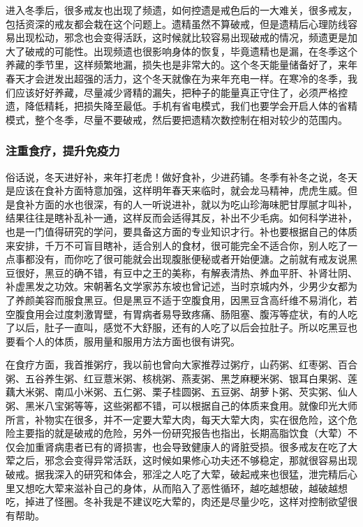 进入冬季后，很多戒友也出现了频遗，如何控遗是戒色后的一大难关，很多戒友，包括资深的戒友都会栽在这个问题上。遗精虽然不算破戒，但是遗精后心理防线容易出现松动，邪念也会变得活跃，这时候就比较容易出现破戒的情况，频遗更是加大了破戒的可能性。出现频遗也很影响身体的恢复，毕竟遗精也是漏，在冬季这个养藏的季节里，这样频繁地漏，损失也是非常大的。这个冬天能量储备好了，来年春天才会迸发出超强的活力，这个冬天就像在为来年充电一样。在寒冷的冬季，我们应该好好养藏，尽量减少肾精的漏失，把种子的能量真正守住了，必须严格控遗，降低精耗，把损失降至最低。手机有省电模式，我们也要学会开启人体的省精模式，整个冬季，尽量不要破戒，然后要把遗精次数控制在相对较少的范围内。

\subsubsection{注重食疗，提升免疫力}

俗话说，冬天进好补，来年打老虎！做好食补，少进药铺。冬季有补冬之说，冬天是应该在食补方面特意加强，这样明年春天来临时，就会龙马精神，虎虎生威。但是食补方面的水也很深，有的人一听说进补，就以为吃山珍海味肥甘厚腻才叫补，结果往往是瞎补乱补一通，这样反而会适得其反，补出不少毛病。如何科学进补，也是一门值得研究的学问，要具备这方面的专业知识才行。补也要根据自己的体质来安排，千万不可盲目瞎补，适合别人的食材，很可能完全不适合你，别人吃了一点事都没有，而你吃了很可能就会出现腹胀便秘或者开始便溏。之前就有戒友说黑豆很好，黑豆的确不错，有豆中之王的美称，有解表清热、养血平肝、补肾壮阴、补虚黑发之功效。宋朝著名文学家苏东坡也曾记述，当时京城内外，少男少女都为了养颜美容而服食黑豆。但是黑豆不适于空腹食用，因黑豆含高纤维不易消化，若空腹食用会过度刺激胃壁，有胃病者易导致疼痛、肠阻塞、腹泻等症状，有的人吃了以后，肚子一直叫，感觉不大舒服，还有的人吃了以后会拉肚子。所以吃黑豆也要看个人的体质，服用量和服用方法方面也很有讲究。

在食疗方面，我首推粥疗，我以前也曾向大家推荐过粥疗，山药粥、红枣粥、百合粥、五谷养生粥、红豆薏米粥、核桃粥、燕麦粥、黑芝麻粳米粥、银耳白果粥、莲藕大米粥、南瓜小米粥、五仁粥、栗子桂圆粥、五豆粥、胡萝卜粥、芡实粥、仙人粥、黑米八宝粥等等，这些粥都不错，可以根据自己的体质来食用。就像印光大师所言，补物实在很多，并不一定要大荤大肉，每天大荤大肉，实在很危险，这个危险主要指的就是破戒的危险，另外一份研究报告也指出，长期高脂饮食（大荤）不仅会加重肾病患者已有的肾损害，也会导致健康人的肾脏受损。很多戒友在吃了大荤之后，邪念会变得异常活跃，这时候如果修心功夫还不够稳定，那就很容易出现破戒。据我深入的研究和体会，邪淫之人吃了大荤，破起戒来也很猛，泄完精后心里又想吃大荤来滋补自己的身体，从而陷入了恶性循环，越吃越想破，越破越想吃，掉进了怪圈。冬补我是不建议吃大荤的，肉还是尽量少吃，这样对控制欲望很有帮助。

